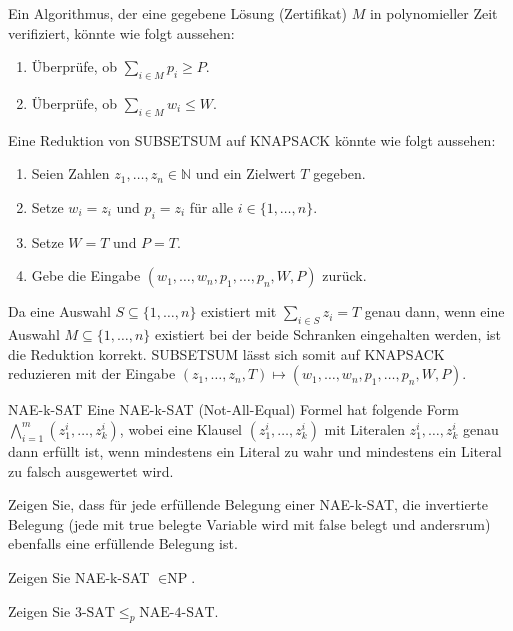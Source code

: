 \documentclass{article}
\begin{document}
\begin{solutions}
  \item Ein Algorithmus, der eine gegebene Lösung (Zertifikat) $M$ in polynomieller Zeit verifiziert, könnte wie folgt aussehen:
  \begin{enumerate}
    \item Überprüfe, ob $\sum_{i \in M} p_i \geq P$.
    \item Überprüfe, ob $\sum_{i \in M} w_i \leq W$.
  \end{enumerate}
  \item Eine Reduktion von SUBSETSUM auf KNAPSACK könnte wie folgt aussehen:
  \begin{enumerate}
    \item Seien Zahlen $z_1, \ldots, z_n \in \mathbb{N}$ und ein Zielwert $T$ gegeben.
    \item Setze $w_i = z_i$ und $p_i = z_i$ für alle $i \in \{1, \ldots, n\}$.
    \item Setze $W = T$ und $P = T$.
    \item Gebe die Eingabe $(w_1, \ldots, w_n, p_1, \ldots, p_n, W, P)$ zurück.
  \end{enumerate}
  Da eine Auswahl $S \subseteq \{1, \ldots, n\}$ existiert mit $\sum_{i \in S} z_i = T$ genau dann, wenn eine Auswahl $M \subseteq \{1, \ldots, n\}$ existiert bei der beide Schranken eingehalten werden, ist die Reduktion korrekt. SUBSETSUM lässt sich somit auf KNAPSACK reduzieren mit der Eingabe $(z_1, \ldots, z_n, T) \mapsto (w_1, \ldots, w_n, p_1, \ldots, p_n, W, P)$.
\end{solutions}

\begin{eexercises}{NAE-k-SAT}{
    Eine NAE-k-SAT (Not-All-Equal) Formel hat folgende Form $\bigwedge_{i=1}^m (z_1^i, \dots, z_k^i)$, wobei eine Klausel $(z_1^i, \dots, z_k^i)$ mit Literalen $z_1^i, \dots, z_k^i$ genau dann erfüllt ist, wenn mindestens ein Literal zu wahr und mindestens ein Literal zu falsch ausgewertet wird.
  }
  \item Zeigen Sie, dass für jede erfüllende Belegung einer NAE-k-SAT, die invertierte Belegung (jede mit true belegte Variable wird mit false belegt und andersrum) ebenfalls eine erfüllende Belegung ist.
  \item Zeigen Sie NAE-k-SAT $\in \text{NP}$.
  \item Zeigen Sie $3\text{-SAT} \leq_p \text{NAE-4-SAT}$.
\end{eexercises}
\end{document}
